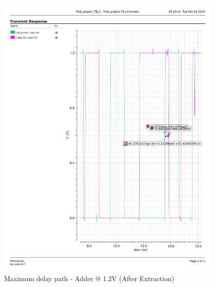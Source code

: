 \documentclass[a4paper,12pt]{article}
\begin{document}
\begin{figure}[H]
\begin{minipage}{0.49\textwidth}
        \includegraphics[width=\textwidth]{delay/CP_max_add_1.2_ex.pdf}
        \caption{Maximum delay path - Adder @ 1.2V (After Extraction)}
    \end{minipage}
\end{figure}
\end{document}
